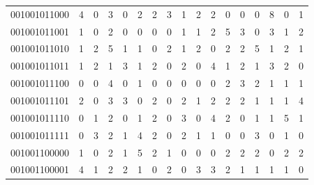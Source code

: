 \documentclass[10pt,a4paper]{article}
\begin{document}
\begin{longtable}{ |c|c|c|c|c|c|c|c|c|c|c|c|c|c|c|c|c| }
    001001011000              & 4                            & 0                                & 3                            & 0                              & 2   & 2   & 3   & 1   & 2   & 2   & 0   & 0   & 0   & 8   & 0   & 1   \\
    001001011001              & 1                            & 0                                & 2                            & 0                              & 0   & 0   & 0   & 1   & 1   & 2   & 5   & 3   & 0   & 3   & 1   & 2   \\
    001001011010              & 1                            & 2                                & 5                            & 1                              & 1   & 0   & 2   & 1   & 2   & 0   & 2   & 2   & 5   & 1   & 2   & 1   \\
    001001011011              & 1                            & 2                                & 1                            & 3                              & 1   & 2   & 0   & 2   & 0   & 4   & 1   & 2   & 1   & 3   & 2   & 0   \\
    001001011100              & 0                            & 0                                & 4                            & 0                              & 1   & 0   & 0   & 0   & 0   & 0   & 2   & 3   & 2   & 1   & 1   & 1   \\
    001001011101              & 2                            & 0                                & 3                            & 3                              & 0   & 2   & 0   & 2   & 1   & 2   & 2   & 2   & 1   & 1   & 1   & 4   \\
    001001011110              & 0                            & 1                                & 2                            & 0                              & 1   & 2   & 0   & 3   & 0   & 4   & 2   & 0   & 1   & 1   & 5   & 1   \\
    001001011111              & 0                            & 3                                & 2                            & 1                              & 4   & 2   & 0   & 2   & 1   & 1   & 0   & 0   & 3   & 0   & 1   & 0   \\
    001001100000              & 1                            & 0                                & 2                            & 1                              & 5   & 2   & 1   & 0   & 0   & 0   & 2   & 2   & 2   & 0   & 2   & 2   \\
    001001100001              & 4                            & 1                                & 2                            & 2                              & 1   & 0   & 2   & 0   & 3   & 3   & 2   & 1   & 1   & 1   & 1   & 0   \\

\end{longtable}
\end{document}
